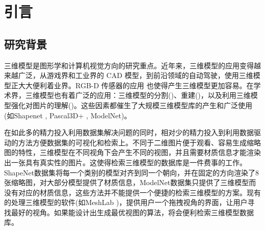 \documentclass[UTF8,openany,AutoFakeBold,AutoFakeSlant,cs4size]{ctexbook}
\begin{document}
{
	\fancyhf{}
	\fancyfoot[CO,CE]{~\thepage~}
	\renewcommand{\headrulewidth}{0.7pt}
	\renewcommand{\footrulewidth}{0pt}
}
\fancyhf{}
\fancyfoot[CO,CE]{~\thepage~}
\renewcommand{\headrulewidth}{0.7pt}
\renewcommand{\footrulewidth}{0pt}
\renewcommand{\contentsname}{\centerline{全文目录}}
\tableofcontents
{}
\clearpage





\normalsize
\linespread{1.5}\selectfont
{
	\fancyhf{}
	\fancyhead[RE,RO]{\leftmark}
	\fancyfoot[CO,CE]{~\thepage~}
	\renewcommand{\headrulewidth}{0.7pt}
	\renewcommand{\footrulewidth}{0pt}
}
\fancyhf{}
\fancyhead[RE,RO]{\leftmark}
\fancyfoot[CO,CE]{~\thepage~}
\renewcommand{\headrulewidth}{0.7pt}
\renewcommand{\footrulewidth}{0pt}



\chapter{引言}

\section{研究背景}

三维模型是图形学和计算机视觉方向的研究重点。近年来，三维模型的应用变得越来越广泛，从游戏界和工业界的 CAD 模型，到前沿领域的自动驾驶，使用三维模型正大大便利着业界。RGB-D 传感器的应用
也使得产生三维模型更加容易。在学术界，三维模型也有着广泛的应用：三维模型的分割(\cite{Chen2009ABF, Kundu2014JointSS})、重建(\cite{Choy20163DR2N2AU, Mandikal20183DLMNetLE})，以及利用三维模型强化对图片的理解(\cite{Choy2015EnrichingOD})。这些因素都催生了大规模三维模型库的产生和广泛使用(如Shapenet \cite{Chang2015ShapeNetAI}, Pascal3D+ \cite{Xiang2014BeyondPA}, ModelNet\cite{Wu20143DSA})。

在如此多的精力投入利用数据集解决问题的同时，相对少的精力投入到利用数据驱动的方法方便数据集的可视化和检索上。不同于二维图片便于观看、容易生成缩略图的特性，三维模型在不同视角下会产生不同的视图，并且需要材质信息才能渲染出一张具有真实性的图片。这使得检索三维模型的数据库是一件费事的工作。ShapeNet数据集\cite{Chang2015ShapeNetAI}将每一个类别的模型对齐到同一个朝向，并在固定的方向渲染了8张缩略图，对大部分模型提供了材质信息，ModelNet数据集\cite{Wu20143DSA}只提供了三维模型而没有对应的材质信息，这些方法并不能提供一个便捷的检索三维模型的方案。现有的处理三维模型的软件(如MeshLab \cite{Cignoni2008MeshLabAO})，提供用户一个拖拽视角的界面，让用户寻找最好的视角。如果能设计出生成最优视图的算法，将会便利检索三维模型数据库。
\end{document}
